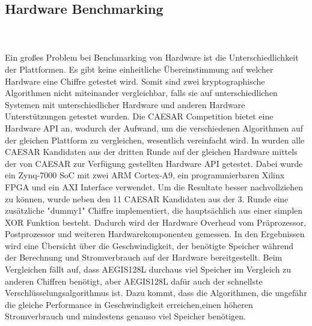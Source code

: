 \subsection{Hardware Benchmarking}
\\
\\
Ein großes Problem bei Benchmarking von Hardware ist die Unterschiedlichkeit der Plattformen. Es gibt keine einheitliche Übereinstimmung auf welcher Hardware eine Chiffre getestet wird. Somit sind zwei kryptographische Algorithmen nicht miteinander vergleichbar, falls sie auf unterschiedlichen Systemen mit unterschiedlicher Hardware und anderen Hardware Unterstützungen getestet wurden. Die \gls{CAESAR} Competition bietet eine Hardware \gls{API} an, wodurch der Aufwand, um die verschiedenen Algorithmen auf der gleichen Plattform zu vergleichen, wesentlich vereinfacht wird. 
In  \cite{8383893} wurden alle CAESAR Kandidaten aus der dritten Runde auf der gleichen Hardware mittels der von CAESAR zur Verfügung gestellten Hardware \gls{API} getestet. Dabei wurde ein Zynq-7000 \gls{SoC} mit zwei ARM Cortex-A9, ein programmierbaren Xilinx FPGA und ein AXI Interface verwendet. 
Um die Resultate besser nachvollziehen zu können, wurde neben den 11 CAESAR Kandidaten aus der 3. Runde eine zusätzliche "dummy1" Chiffre implementiert, die hauptsächlich aus einer simplen XOR Funktion besteht. Dadurch wird der Hardware Overhead vom Präprozessor, Postprozessor und weiteren Hardwarekomponenten gemessen. In den Ergebnissen wird eine Übersicht über die Geschwindigkeit, der benötigte Speicher während der Berechnung und Stromverbrauch auf der Hardware bereitgestellt. Beim Vergleichen fällt auf, dass AEGIS128L durchaus viel Speicher im Vergleich zu anderen Chiffren  benötigt, aber AEGIS128L dafür auch der schnellste Verschlüsselungsalgorithmus ist. Dazu kommt, dass die Algorithmen, die ungefähr die gleiche Performance in Geschwindigkeit erreichen,einen höheren Stromverbrauch und mindestens genauso viel Speicher benötigen.
